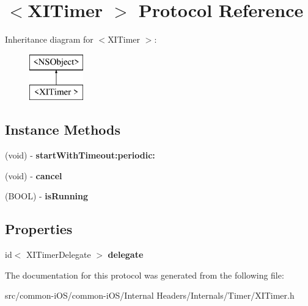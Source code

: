 \hypertarget{protocol_x_i_timer_01-p}{}\section{$<$X\+I\+Timer $>$ Protocol Reference}
\label{protocol_x_i_timer_01-p}
Inheritance diagram for $<$X\+I\+Timer $>$\+:\begin{figure}[H]
\begin{center}
\leavevmode
\includegraphics[height=2.000000cm]{protocol_x_i_timer_01-p}
\end{center}
\end{figure}
\subsection*{Instance Methods}
\begin{DoxyCompactItemize}
\item 
\hypertarget{protocol_x_i_timer_01-p_a5d7eaf9960ba8a32871b86e06b686238}{}\label{protocol_x_i_timer_01-p_a5d7eaf9960ba8a32871b86e06b686238} 
(void) -\/ {\bfseries start\+With\+Timeout\+:periodic\+:}
\item 
\hypertarget{protocol_x_i_timer_01-p_a1573605fd07b2e04171bbbb95236f41a}{}\label{protocol_x_i_timer_01-p_a1573605fd07b2e04171bbbb95236f41a} 
(void) -\/ {\bfseries cancel}
\item 
\hypertarget{protocol_x_i_timer_01-p_ab47da9fc41b60aa88d93ea34e00642ad}{}\label{protocol_x_i_timer_01-p_ab47da9fc41b60aa88d93ea34e00642ad} 
(B\+O\+OL) -\/ {\bfseries is\+Running}
\end{DoxyCompactItemize}
\subsection*{Properties}
\begin{DoxyCompactItemize}
\item 
\hypertarget{protocol_x_i_timer_01-p_a19e9da407d07cb5b5a173894baf1929d}{}\label{protocol_x_i_timer_01-p_a19e9da407d07cb5b5a173894baf1929d} 
id$<$ X\+I\+Timer\+Delegate $>$ {\bfseries delegate}
\end{DoxyCompactItemize}


The documentation for this protocol was generated from the following file\+:\begin{DoxyCompactItemize}
\item 
src/common-\/i\+O\+S/common-\/i\+O\+S/\+Internal Headers/\+Internals/\+Timer/X\+I\+Timer.\+h\end{DoxyCompactItemize}
